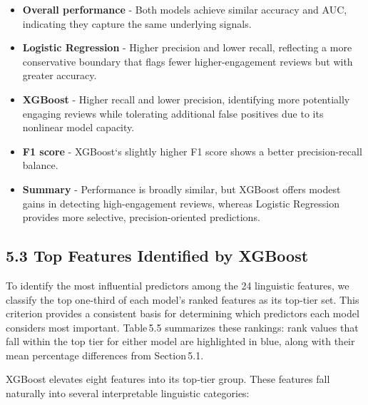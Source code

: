 \begin{itemize}

\item \textbf{Overall performance} - Both models achieve similar accuracy and AUC, indicating they capture the same underlying signals. 

\item \textbf{Logistic Regression} - Higher precision and lower recall, reflecting a more conservative boundary that flags fewer higher-engagement reviews but with greater accuracy.

\item \textbf{XGBoost} - Higher recall and lower precision, identifying more potentially engaging reviews while tolerating additional false positives due to its nonlinear model capacity.  

\item \textbf{F1 score} - XGBoost`s slightly higher F1 score shows a better precision-recall balance.

\item \textbf{Summary} - Performance is broadly similar, but XGBoost offers modest gains in detecting high-engagement reviews, whereas Logistic Regression provides more selective, precision-oriented predictions.  

\end{itemize}

\hypertarget{top-features-identified-by-xgboost}{%
\subsection{5.3 Top Features Identified by
XGBoost}\label{top-features-identified-by-xgboost}}

To identify the most influential predictors among the 24 linguistic
features, we classify the top one‑third of each model's ranked features
as its top‑tier set. This criterion provides a consistent basis for
determining which predictors each model considers most important.
Table\,5.5 summarizes these rankings: rank values that fall within the
top tier for either model are highlighted in blue, along with their mean
percentage differences from Section\,5.1.

XGBoost elevates eight features into its top‑tier group. These features
fall naturally into several interpretable linguistic categories:

